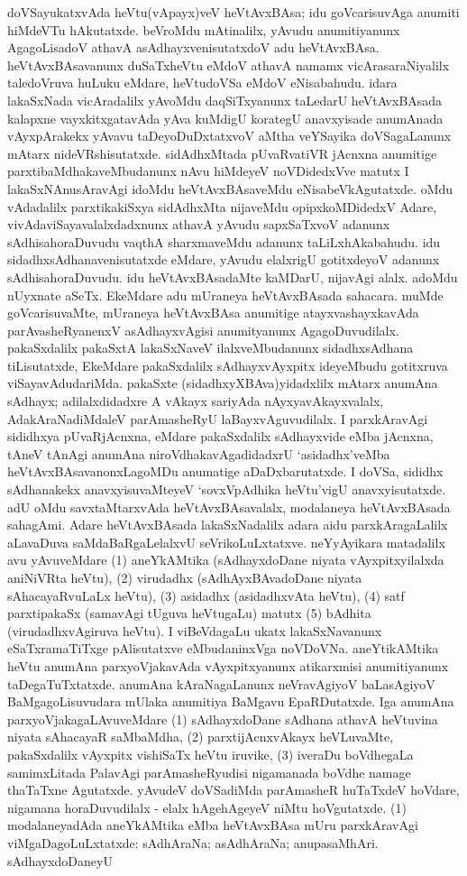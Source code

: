 doVSayukatxvAda heVtu(vApayx)veV heVtAvxBAsa; idu goVcarisuvAga anu\-miti hiMdeVTu hAkutatxde. beVroMdu mAtinalilx, yAvudu anumitiyanunx AgagoLi\-sadoV athavA asAdhayxvenisutatxdoV adu heVtAvxBAsa. heVtAvxBAsavanunx duSaTxheVtu eMdoV athavA namamx vicArasaraNiyalilx taledoVruva huLuku eMdare, heVtu\-doVSa eMdoV eNisabahudu. idara lakaSxNada vicAradalilx yAvoMdu daqSiTxyanunx taLedarU heVtAvxBAsada kalapxne vayxkitxgatavAda yAva kuMdigU korategU anavxyisade anumAnada vAyxpArakekx yAvavu taDeyoDuDxtatxvoV aMtha veYSayika doVSagaLanunx mAtarx nideVRshi\-sutatxde. sidAdhxMtada pUvaRvatiVR jAcnxna anumitige parxtibaMdhakaveMbudanunx nAvu hiMdeyeV noVDidedxVve matutx I lakaSxNAnusAravAgi idoMdu heVtAvxBAsaveMdu eNisabeVkAgutatxde. oMdu vAdadalilx parxtikakiSxya sidAdhxMta nijaveMdu opipx\-koMDi\-dedxV Adare, vivAdaviSayavalalxdadxnunx athavA yAvudu sapxSaTxvoV adanunx sAdhisahoraDuvudu vaqthA sharxmaveMdu adanunx taLiLxhAkabahudu. idu sidadhxsAdhanavenisutatxde \hbox{eMdare}, yAvudu elalxrigU gotitxdeyoV adanunx sAdhisahoraDuvudu. idu heVtAvx\-BAsa\-daMte kaMDarU, nijavAgi alalx. adoMdu nUyxnate aSeTx. EkeMdare adu mUra\-neya heVtAvxBAsada sahacara. muMde goVcarisuvaMte, mUraneya heVtAvxBAsa anu\-mitige atayxvashayxkavAda parAvasheRyanenxV asAdhayxvAgisi anumityanunx AgagoDuvu\-dilalx. pakaSxdalilx pakaSxtA lakaSxNaveV ilalxveMbudanunx sidadhxsAdhana tiLisutatxde, EkeMdare pakaSxdalilx sAdhayxvAyxpitx ideyeMbudu gotitxruva viSayavAdudariMda. pakaSxte (sidadhxyXBAva)yidadxlilx mAtarx anumAna sAdhayx; adilalxdidadxre A vAkayx sariyAda nAyxyavAkayxvalalx, AdakAraNa\-diMdaleV parAmasheRyU laBayxvAguvudilalx. I parxkAravAgi sididhxya pUvaR\-jAcnxna, eMdare pakaSxdalilx sAdhayxvide eMba jAcnxna, tAneV tAnAgi anumAna niroVdhaka\-vAga\-didadxrU `asidadhx'veMba heVtAvxBAsavanonxLagoMDu anumatige aDaDxbarutatxde. I doVSa, sididhx sAdhanakekx anavxyisuvaMteyeV `sovxVpAdhika heVtu'vigU anavxyisutatxde. adU oMdu savxtaMtarxvAda heVtAvxBAsavalalx, modalaneya heVtAvxBAsada sahagAmi. Adare heVtAvxBAsada lakaSxNadalilx adara aidu parxkAragaLalilx aLavaDuva saMdaBaRgaLelalxvU seVri\-koLuLxtatxve. neYyAyikara matadalilx avu yAvuveMdare (1) aneYkAMtika (sAdhayx\-doDane niyata vAyxpitxyilalxda aniNiVRta heVtu), (2) virudadhx (sAdhAyxBAvadoDane \hbox{niyata} sAhacayaRvuLaLx heVtu), (3) asidadhx (asidadhxvAta heVtu), (4) satf parxtipakaSx (sama\-vAgi tUguva heVtugaLu) matutx (5) bAdhita (virudadhxvAgiruva heVtu). I viBeVdagaLu ukatx lakaSxNavanunx eSaTxramaTiTxge pAlisutatxve eMbudaninxVga noVDoVNa. aneYti\-kAMtika heVtu anumAna parxyoVjakavAda vAyxpitxyanunx atikarxmisi anumitiyanunx taDegaTuTxtatxde. anumAna kAraNagaLanunx neVravAgiyoV baLasAgiyoV BaMgagoLisu\-vudara mUlaka anumitiya BaMgavu EpaRDutatxde. Iga anumAna parxyoVjaka\-gaLAvuveMdare (1) sAdhayxdoDane sAdhana athavA heVtuvina niyata sAhacayaR \hbox{saMbaMdha}, (2) parxtijAcnxvAkayx heVLuvaMte, pakaSxdalilx vAyxpitx vishiSaTx heVtu iruvike, (3) iveraDu boVdhegaLa samimxLitada PalavAgi parAmasheRyudisi nigamanada boVdhe namage thaTaTxne Agutatxde. yAvudeV doVSadiMda parAmasheR huTaTxdeV hoVdare, nigamana horaDuvudilalx - elalx hAgehAgeyeV niMtu hoVgutatxde. (1) modalaneyadAda aneYkAMtika eMba heVtAvxBAsa mUru parxkAravAgi viMgaDagoLuLxtatxde:  sAdhAraNa;  asAdhAraNa;  anupasaMhAri. sAdhayxdoDaneyU 